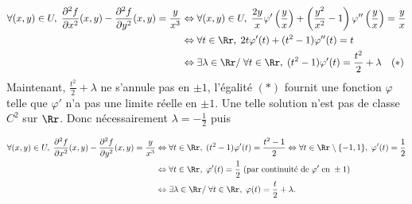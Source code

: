 {{\begin{align*}\ensuremath
\forall(x,y)\in U,\;\frac{\partial^2f}{\partial x^2}(x,y)-\frac{\partial^2f}{\partial y^2}(x,y)=\frac{y}{x^3}&\Leftrightarrow\forall(x,y)\in U,\;\frac{2y}{x}\varphi'\left(\frac{y}{x}\right)+\left(\frac{y^2}{x^2}-1\right)\varphi''\left(\frac{y}{x}\right)=\frac{y}{x}\\
 &\Leftrightarrow\forall t\in\Rr,\;2t\varphi'(t)+(t^2-1)\varphi''(t)=t\\
 &\Leftrightarrow\exists\lambda\in\Rr/\;\forall t\in\Rr,\;(t^2-1)\varphi'(t)=\frac{t^2}{2}+\lambda\quad(*)
\end{align*}
Maintenant, $\frac{t^2}{2}+\lambda$ ne s'annule pas en $\pm1$, l'égalité $(*)$ fournit une fonction $\varphi$ telle que $\varphi'$ n'a pas une limite réelle en $\pm1$. Une telle solution n'est pas de classe $C^2$ sur $\Rr$. Donc nécessairement $\lambda=-\frac{1}{2}$ puis

\begin{align*}\ensuremath
\forall(x,y)\in U,\;\frac{\partial^2f}{\partial x^2}(x,y)-\frac{\partial^2f}{\partial y^2}(x,y)=\frac{y}{x^3}&\Leftrightarrow\forall t\in\Rr,\;(t^2-1)\varphi'(t)=\frac{t^2-1}{2}\Leftrightarrow\forall t\in\Rr\setminus\{-1,1\},\;\varphi'(t)=\frac{1}{2}\\
 &\Leftrightarrow\forall t\in\Rr,\;\varphi'(t)=\frac{1}{2}\;(\text{par continuité de}\;\varphi'\;\text{en}\;\pm1)\\
 &\Leftrightarrow\exists\lambda\in\Rr/\;\forall t\in\Rr,\;\varphi(t)=\frac{t}{2}+\lambda.
\end{align*}
}
}
